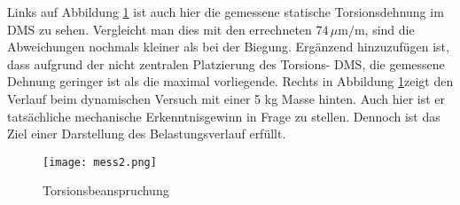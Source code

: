 Links auf Abbildung \ref{fig:mess2} ist auch hier die gemessene statische Torsionsdehnung im DMS zu sehen.
Vergleicht man dies mit den errechneten $74\,\mu\text{m/m}$, sind die Abweichungen nochmals kleiner als bei der Biegung.
Ergänzend hinzuzufügen ist, dass aufgrund der nicht zentralen Platzierung des Torsions- DMS, die gemessene Dehnung geringer ist als die maximal vorliegende.
Rechts in Abbildung \ref{fig:mess2}zeigt den Verlauf beim dynamischen Versuch mit einer 5 kg Masse hinten. Auch hier ist er tatsächliche mechanische Erkenntnisgewinn in Frage zu stellen.
Dennoch ist das Ziel einer Darstellung des Belastungsverlauf erfüllt. 
\begin{figure}[htbp]
    \begin{center}
        \texttt{[image: mess2.png]}
        \caption[Torsionsbeanspruchung(Abbildungsverzeichnis)]{Torsionsbeanspruchung}
        
        \label{fig:mess2}
    \end{center}
\end{figure}